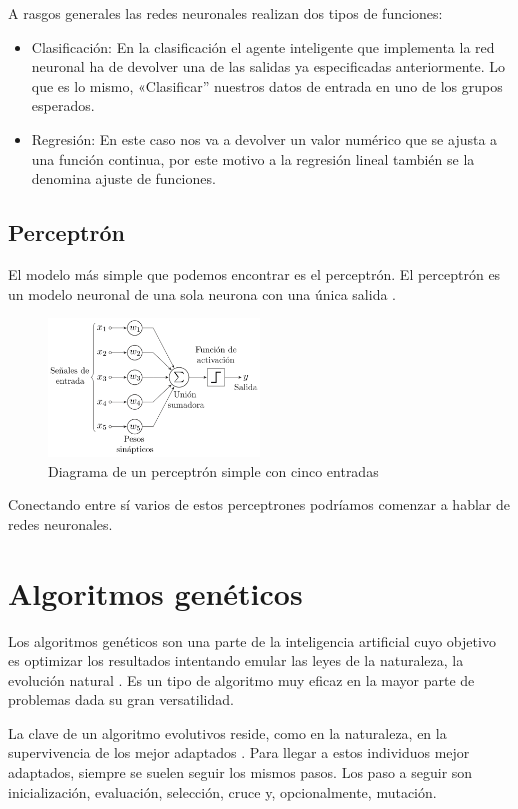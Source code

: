 A rasgos generales las redes neuronales realizan dos tipos de funciones:
\begin{itemize}
    \item Clasificación: En la clasificación el agente inteligente que implementa la red neuronal ha de devolver una de las salidas ya especificadas anteriormente. Lo que es lo mismo, «Clasificar'' nuestros datos de entrada en uno de los grupos esperados.
    \item Regresión: En este caso nos va a devolver un valor numérico que se ajusta a una función continua, por este motivo a la regresión lineal también se la denomina ajuste de funciones.
\end{itemize}


\subsection{Perceptrón}
El modelo más simple que podemos encontrar es el perceptrón. El perceptrón es un modelo neuronal de una sola neurona con una única salida \cite{wiki:perceptron}.
\begin{figure}[]
  \centering
  \includegraphics[width=0.5\textwidth]{../img/perceptron}\caption{Diagrama de un perceptrón simple con cinco entradas}
\end{figure}

Conectando entre sí varios de estos perceptrones podríamos comenzar a hablar de redes neuronales.


\section{Algoritmos genéticos}

 Los algoritmos genéticos son una parte de la inteligencia artificial cuyo objetivo es optimizar los resultados intentando emular las leyes de la naturaleza, la evolución natural \cite{AraujoCervigon}. Es un tipo de algoritmo muy eficaz en la mayor parte de problemas dada su gran versatilidad.

La clave de un algoritmo evolutivos reside, como en la naturaleza, en la supervivencia de los mejor adaptados \cite{JHolland}. Para llegar a estos individuos mejor adaptados, siempre se suelen seguir los mismos pasos. Los paso a seguir son inicialización, evaluación, selección, cruce y, opcionalmente, mutación.

